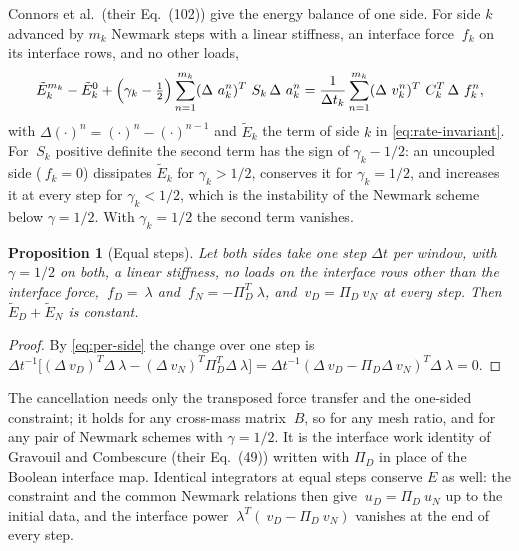 \documentclass[11pt]{article}
\newtheorem{proposition}{Proposition}
\begin{document}
Connors et al.\ (their Eq.~(102)) give the energy balance of one side. For
side $k$ advanced by $m_k$ Newmark steps with a linear stiffness, an
interface force $~f_k$ on its interface rows, and no other loads,
\begin{equation}
  \tilde{E}_{k}^{m_k} - \tilde{E}_{k}^{0}
  + \Bigl(\gamma_k - \tfrac12\Bigr) \sum_{n=1}^{m_k}
    (\Delta ~a_k^n)^T ~S_k\, \Delta ~a_k^n
  = \frac{1}{\Delta t_k} \sum_{n=1}^{m_k}
    (\Delta ~v_k^n)^T ~C_k^T\, \Delta ~f_k^n ,
  \label{eq:per-side}
\end{equation}
with $\Delta(\cdot)^n = (\cdot)^n - (\cdot)^{n-1}$ and $\tilde{E}_k$ the
term of side $k$ in \eqref{eq:rate-invariant}. For $~S_k$ positive
definite the second term has the sign of $\gamma_k - 1/2$: an uncoupled
side ($~f_k = 0$) dissipates $\tilde{E}_k$ for $\gamma_k > 1/2$, conserves
it for $\gamma_k = 1/2$, and increases it at every step for
$\gamma_k < 1/2$, which is the instability of the Newmark scheme below
$\gamma = 1/2$. With $\gamma_k = 1/2$ the second term vanishes.

\begin{proposition}[Equal steps]
\label{prop:equal}
Let both sides take one step $\Delta t$ per window, with $\gamma = 1/2$ on
both, a linear stiffness, no loads on the interface rows other than the
interface force, $~f_D = ~\lambda$ and $~f_N = -\Pi_D^T ~\lambda$, and
$~v_D = \Pi_D ~v_N$ at every step. Then $\tilde{E}_D + \tilde{E}_N$ is
constant.
\end{proposition}
\begin{proof}
By \eqref{eq:per-side} the change over one step is
$\Delta t^{-1}\bigl[(\Delta ~v_D)^T \Delta~\lambda
- (\Delta ~v_N)^T \Pi_D^T \Delta~\lambda\bigr]
= \Delta t^{-1} (\Delta ~v_D - \Pi_D \Delta ~v_N)^T \Delta~\lambda = 0$.
\end{proof}

The cancellation needs only the transposed force transfer and the
one-sided constraint; it holds for any cross-mass matrix $~B$, so for any
mesh ratio, and for any pair of Newmark schemes with $\gamma = 1/2$. It is
the interface work identity of Gravouil and Combescure (their Eq.~(49))
written with $\Pi_D$ in place of the Boolean interface map. Identical
integrators at equal steps conserve $E$ as well: the constraint and the
common Newmark relations then give $~u_D = \Pi_D ~u_N$ up to the initial
data, and the interface power $~\lambda^T (~v_D - \Pi_D ~v_N)$ vanishes at
the end of every step.
\end{document}
